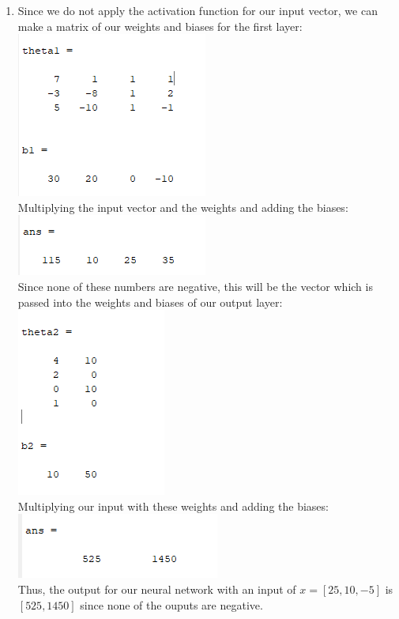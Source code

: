 \documentclass[10pt]{exam}
\begin{document}
\begin{enumerate}
    \item Since we do not apply the activation function for our input vector, we can 
    make a matrix of our weights and biases for the first layer: \\
    \includegraphics{theta1.png}\\
    Multiplying the input vector and the weights and adding the biases: \\
    \includegraphics{a.png}\\
    Since none of these numbers are negative, this will be the vector which is passed 
    into the weights and biases of our output layer: \\
    \includegraphics{b.png}\\
    Multiplying our input with these weights and adding the biases: \\
    \includegraphics{c.png}\\
    Thus, the output for our neural network with an input of
     $x = \left[ 25, 10, -5 \right]$ is $\left[ 525, 1450 \right]$ since none of the
     ouputs are negative. 

\end{enumerate}
\end{document}
